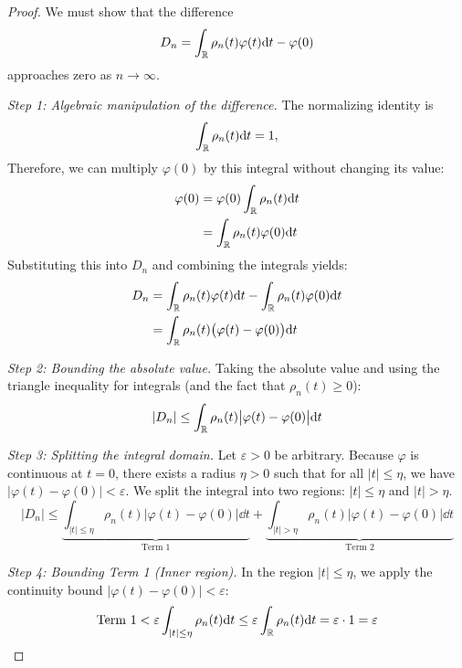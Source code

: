 \begin{proof}
We must show that the difference \[
D_n = \int_{\mathbb{R}} \rho_n(t) \varphi(t) \mathrm{d} t - \varphi(0)
\] approaches zero as $n \to \infty$.

\textit{Step 1: Algebraic manipulation of the difference.}
The normalizing identity is
\[
\int_{\mathbb{R}} \rho_n(t) \mathrm{d} t = 1,
\]
Therefore, we can multiply $\varphi(0)$ by this integral without changing its value:
\begin{equation}
\begin{aligned}
\varphi(0) &= \varphi(0) \int_{\mathbb{R}} \rho_n(t) \mathrm{d} t \\
&= \int_{\mathbb{R}} \rho_n(t) \varphi(0) \mathrm{d} t
\end{aligned}
\end{equation}
Substituting this into $D_n$ and combining the integrals yields:
\begin{equation}
\begin{aligned}
D_n &= \int_{\mathbb{R}} \rho_n(t) \varphi(t) \mathrm{d} t - \int_{\mathbb{R}} \rho_n(t) \varphi(0) \mathrm{d} t \\
&= \int_{\mathbb{R}} \rho_n(t) \big(\varphi(t) - \varphi(0)\big) \mathrm{d} t
\end{aligned}
\end{equation}

\textit{Step 2: Bounding the absolute value.}
Taking the absolute value and using the triangle inequality for integrals (and the fact that $\rho_n(t) \geq 0$):
\begin{equation}
|D_n| \leq \int_{\mathbb{R}} \rho_n(t) \big|\varphi(t) - \varphi(0)\big| \mathrm{d} t
\end{equation}

\textit{Step 3: Splitting the integral domain.}
Let $\varepsilon > 0$ be arbitrary. Because $\varphi$ is continuous at $t=0$, there exists a radius $\eta > 0$ such that for all $|t| \leq \eta$, we have $|\varphi(t) - \varphi(0)| < \varepsilon$. We split the integral into two regions: $|t| \leq \eta$ and $|t| > \eta$.
\begin{equation}
|D_n| \leq \underbrace{\int_{|t| \leq \eta} \rho_n(t) \big|\varphi(t) - \varphi(0)\big| \dd t}_{\text{Term 1}} + \underbrace{\int_{|t| > \eta} \rho_n(t) \big|\varphi(t) - \varphi(0)\big| \dd t}_{\text{Term 2}}
\end{equation}

\textit{Step 4: Bounding Term 1 (Inner region).}
In the region $|t| \leq \eta$, we apply the continuity bound $|\varphi(t) - \varphi(0)| < \varepsilon$:
\begin{equation}
\text{Term 1} < \varepsilon \int_{|t| \leq \eta} \rho_n(t) \mathrm{d} t \leq \varepsilon \int_{\mathbb{R}} \rho_n(t) \mathrm{d} t = \varepsilon \cdot 1 = \varepsilon
\end{equation}


\end{proof}
